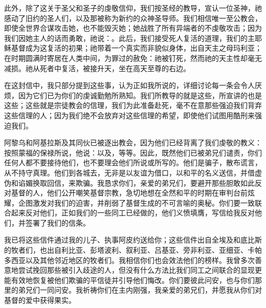此外，除了这关于圣父和圣子的虔敬信仰，我们按圣经的教导，宣认一位圣神，祂感动了旧约的圣人们，以及那被称为新约的众神圣导师。我们相信唯一至公教会，即使全世界合谋攻击她，也不能毁灭她；她战胜了所有异端者的不虔敬攻击；因为我们因她主人的话而勇敢，祂说：。此后，我们接受死人复活的道理，我们的主耶稣基督成为这复活的初果；祂带着一个真实而非貌似身体，出自天主之母玛利亚；在时期圆满时寄居在人类中间，为罪过的赦免：祂被钉死，然而祂的天主性却毫无减损。祂从死者中复活，被接升天，坐在高天至尊的右边。\par

在这封信中，我只部分提到这些事，认为正如我所说的，详细讨论每一条会令人厌烦，因为它们已为你们的虔诚勤勉所熟知。我们所教导的就是这些，所宣讲的也是这些；这些就是宗徒教会的信理，我们为此准备赴死，毫不在意那些强迫我们背弃这些信理的人；因为我们绝不会放弃对这些信理的希望，即使他们试图用酷刑来强迫我们。\par

阿黎乌和阿基拉斯及其同伙已被逐出教会，因为他们已经背离了我们虔敬的教义：按照蒙福的保禄所说，他说：以及，等等。因此，既然他们已被弟兄们谴责，你们任何人都不要接待他们，也不要理会他们所说或所写的。他们是骗子，散布谎言，从不持守真理。他们到各城去，无非是以友谊为借口，以和平的名义送信，并借虚伪和谄媚换取回信，来欺骗。我恳求你们，亲爱的弟兄们，要避开那些胆敢如此反对基督的人，他们公开嘲笑基督宗教，急切地想在全然和平的时期在审判台前炫耀，企图激发对我们的迫害，并削弱了基督生成的不可言喻的奥秘。你们要一致联合起来反对他们，正如我们的一些同工已经做的，他们义愤填膺，写信给我反对他们，并签署了我们的信条。\par

我已将这些信件通过我的儿子、执事阿皮约送给你；这些信件出自全埃及和底比斯的牧者们，也出自利比亚、彭塔波利、叙利亚、吕基亚、旁非利亚、亚细亚、卡帕多西亚以及其他邻近地区的牧者们。我相信你们也会效法他们的榜样。我曾多次善意地尝试挽回那些被引入歧途的人，但没有什么方法比我们同工之间联合的显现更能有效地恢复被他们欺骗的平信徒并引导他们悔改。你们要彼此问安，也与你们那里的弟兄们一同问安。我祈祷你们在主内刚强，我亲爱的弟兄们，并愿我从你们对基督的爱中获得果实。\par

\par

